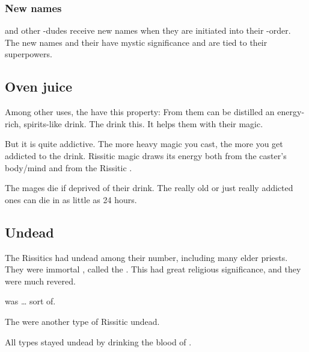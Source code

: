 \subsubsection{New names}
 and other \uber-dudes receive new names when they are initiated into their \uber-order. 
The new names and their  have mystic significance and are tied to their superpowers. 








\subsection{Oven juice}
Among other uses, the  have this property: 
From them can be distilled an energy-rich, spirits-like drink. 
The \nyzlet{} drink this. 
It helps them with their magic. 

But it is quite addictive. 
The more heavy magic you cast, the more you get addicted to the drink. 
Rissitic magic draws its energy both from the caster's body/mind and from the Rissitic \matrix. 

The mages die if deprived of their drink. 
The really old or just really addicted ones can die in as little as 24 hours. 









\subsection{Undead}
\index{\XulGann}
The Rissitics had undead among their number, including many elder priests. 
They were immortal , called the \XulGann.  
This had great religious significance, and they were much revered. 

 was \ldots{} sort of. 

The  were another type of Rissitic undead. 

All types stayed undead by drinking the blood of . 










